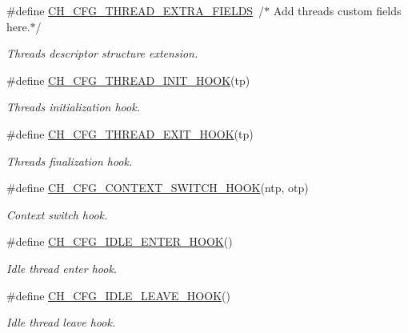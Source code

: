 \begin{DoxyCompactItemize}
\item 
\#define \hyperlink{group__config_ga376f299366010470175d4abbb0e8096b}{C\+H\+\_\+\+C\+F\+G\+\_\+\+T\+H\+R\+E\+A\+D\+\_\+\+E\+X\+T\+R\+A\+\_\+\+F\+I\+E\+L\+DS}~/$\ast$ Add threads custom fields here.$\ast$/
\begin{DoxyCompactList}\small\item\em Threads descriptor structure extension. \end{DoxyCompactList}\item 
\#define \hyperlink{group__config_gaf52424f7ed3a7c4e7e49b144997aed2c}{C\+H\+\_\+\+C\+F\+G\+\_\+\+T\+H\+R\+E\+A\+D\+\_\+\+I\+N\+I\+T\+\_\+\+H\+O\+OK}(tp)
\begin{DoxyCompactList}\small\item\em Threads initialization hook. \end{DoxyCompactList}\item 
\#define \hyperlink{group__config_ga6672f72a17e29db6ff3f951001c007bf}{C\+H\+\_\+\+C\+F\+G\+\_\+\+T\+H\+R\+E\+A\+D\+\_\+\+E\+X\+I\+T\+\_\+\+H\+O\+OK}(tp)
\begin{DoxyCompactList}\small\item\em Threads finalization hook. \end{DoxyCompactList}\item 
\#define \hyperlink{group__config_ga61b9805943d69980f6778106ad3fbb9c}{C\+H\+\_\+\+C\+F\+G\+\_\+\+C\+O\+N\+T\+E\+X\+T\+\_\+\+S\+W\+I\+T\+C\+H\+\_\+\+H\+O\+OK}(ntp,  otp)
\begin{DoxyCompactList}\small\item\em Context switch hook. \end{DoxyCompactList}\item 
\#define \hyperlink{group__config_ga5193dc6602d532b5eb171c6459d80707}{C\+H\+\_\+\+C\+F\+G\+\_\+\+I\+D\+L\+E\+\_\+\+E\+N\+T\+E\+R\+\_\+\+H\+O\+OK}()
\begin{DoxyCompactList}\small\item\em Idle thread enter hook. \end{DoxyCompactList}\item 
\#define \hyperlink{group__config_ga2b4d6d05e655234eb7b46fb16e8180a9}{C\+H\+\_\+\+C\+F\+G\+\_\+\+I\+D\+L\+E\+\_\+\+L\+E\+A\+V\+E\+\_\+\+H\+O\+OK}()
\begin{DoxyCompactList}\small\item\em Idle thread leave hook. \end{DoxyCompactList}\item 

\end{DoxyCompactItemize}
